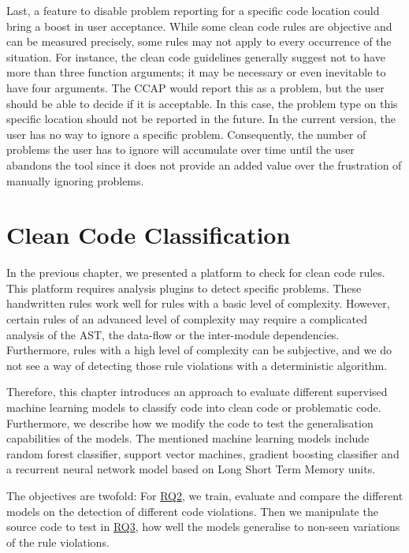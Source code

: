Last, a feature to disable problem reporting for a specific code location could bring a boost in user acceptance. While some clean code rules are objective and can be measured precisely, some rules may not apply to every occurrence of the situation. For instance, the clean code guidelines generally suggest not to have more than three function arguments; it may be necessary or even inevitable to have four arguments. The CCAP would report this as a problem, but the user should be able to decide if it is acceptable. In this case, the problem type on this specific location should not be reported in the future. In the current version, the user has no way to ignore a specific problem. Consequently, the number of problems the user has to ignore will accumulate over time until the user abandons the tool since it does not provide an added value over the frustration of manually ignoring problems.

\section{Clean Code Classification}\label{chap:clean_code_classification}
In the previous chapter, we presented a platform to check for clean code rules. This platform requires analysis plugins to detect specific problems. These handwritten rules work well for rules with a basic level of complexity. However, certain rules of an advanced level of complexity may require a complicated analysis of the AST, the data-flow or the inter-module dependencies. Furthermore, rules with a high level of complexity can be subjective, and we do not see a way of detecting those rule violations with a deterministic algorithm.

Therefore, this chapter introduces an approach to evaluate different supervised machine learning models to classify code into clean code or problematic code. Furthermore, we describe how we modify the code to test the generalisation capabilities of the models. The mentioned machine learning models include random forest classifier, support vector machines, gradient boosting classifier and a recurrent neural network model based on Long Short Term Memory units. 

The objectives are twofold: For \hyperref[rq:2]{RQ2}, we train, evaluate and compare the different models on the detection of different code violations. Then we manipulate the source code to test in \hyperref[rq:3]{RQ3}, how well the models generalise to non-seen variations of the rule violations.

